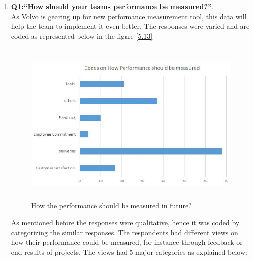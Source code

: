 \begin{enumerate}
    \item \textbf{Q1:“How should your teams performance be measured?”}.\\
    As Volvo is gearing up for new performance measurement tool, this data will help the team to implement it even better. The responses were varied and are coded as represented below in the figure \ref{5.13}\\
    \begin{figure}[H]
    \centering
    \captionsetup{justification=centering, margin=2cm}
    \vspace{1cm}
    \includegraphics[width=15cm, height=8cm]{figure/auxiliary/fig513.PNG}
    \caption{How the performance should be measured in future?}
    \label{fig:5.13}
\end{figure}
   As mentioned before the responses were qualitative, hence it was coded by categorizing the similar responses. The respondents had different views on how their performance could be measured, for instance through feedback or end results of projects. The views had 5 major categories as explained below:\\


\end{enumerate}
